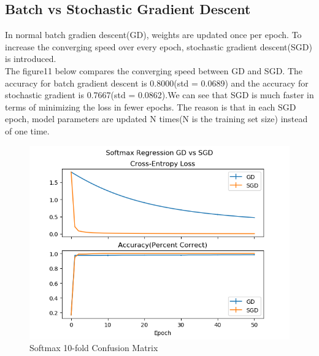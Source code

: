\documentclass{article} %
\begin{document}
\subsection {Batch vs Stochastic Gradient Descent}
In normal batch gradien descent(GD), weights are updated once per epoch. To increase the converging speed over every epoch, stochastic gradient descent(SGD) is introduced.\\
The figure11 below compares the converging speed between GD and SGD. The accuracy for batch gradient descent is 0.8000(std = 0.0689) and the accuracy for stochastic gradient is 0.7667(std = 0.0862).We can see that SGD is much faster in terms of minimizing the loss in fewer epochs. The reason is that in each SGD epoch, model parameters are updated N times(N is the training set size) instead of one time.
\begin{figure}[h]
	\centering
	\includegraphics[scale=0.5]{./graph/gd_vs_sgd.png}
	\caption{Softmax 10-fold Confusion Matrix}
\end{figure}
\end{document}
